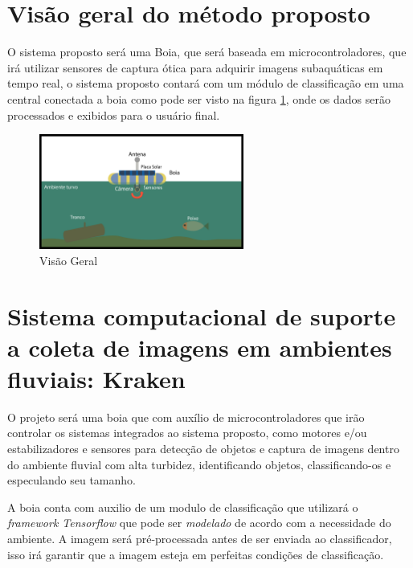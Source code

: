 \section{Visão geral do método proposto}
   
   O sistema proposto será uma Boia, que será baseada em microcontroladores, que irá utilizar sensores de captura ótica para adquirir imagens subaquáticas em tempo real, o sistema proposto contará com um módulo de classificação em uma central conectada a boia como pode ser visto na figura \ref{fig:bigpic}, onde os dados serão processados e exibidos para o usuário final. 
   

\begin{figure}[ht]
	\centering
    \caption{\label{fig:bigpic}Visão Geral}
	\includegraphics[width = 0.6\textwidth]{resources/bugpicturefloater}
\end{figure}

\section{Sistema computacional de suporte a coleta de imagens em ambientes fluviais: Kraken}

O projeto será uma boia que com auxílio de microcontroladores que irão controlar os sistemas integrados ao sistema proposto, como motores e/ou estabilizadores e sensores para detecção de objetos e captura de imagens dentro do ambiente fluvial com alta turbidez, identificando objetos, classificando-os e especulando seu tamanho.

A boia conta com auxilio de um modulo de classificação que utilizará o \textit{framework Tensorflow} que pode ser \textit{modelado} de acordo com a necessidade do ambiente. A imagem será pré-processada antes de ser enviada ao classificador, isso irá garantir que a imagem esteja em perfeitas condições de classificação.

